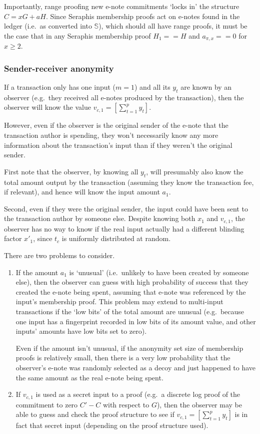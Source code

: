 Importantly, range proofing new e-note commitments `locks in' the structure $C = x G + a H$. Since Seraphis membership proofs act on e-notes found in the ledger (i.e.\ as converted into $\mathbb{S}$), which should all have range proofs, it must be the case that in any Seraphis membership proof $H_1 == H$ and $a_{\pi,x} == 0$ for $x \geq 2$.

\subsubsection{Sender-receiver anonymity}
\label{subsubsec:confidential-transactions-sender-receiver-anonymity}

If a transaction only has one input ($m = 1$) and all its $y_t$ are known by an observer (e.g.\ they received all e-notes produced by the transaction), then the observer will know the value $v_{c,1} = [\sum^{p}_{t=1} y_t]$.

However, even if the observer is the original sender of the e-note that the transaction author is spending, they won't necessarily know any more information about the transaction's input than if they weren't the original sender.

First note that the observer, by knowing all $y_t$, will presumably also know the total amount output by the transaction (assuming they know the transaction fee, if relevant), and hence will know the input amount $a_1$.

Second, even if they were the original sender, the input could have been sent to the transaction author by someone else. Despite knowing both $x_1$ and $v_{c,1}$, the observer has no way to know if the real input actually had a different blinding factor $x'_1$, since $t_c$ is uniformly distributed at random.

There are two problems to consider.
\begin{enumerate}
    \item If the amount $a_1$ is `unusual' (i.e.\ unlikely to have been created by someone else), then the observer can guess with high probability of success that they created the e-note being spent, assuming that e-note was referenced by the input's membership proof. This problem may extend to multi-input transactions if the `low bits' of the total amount are unusual (e.g.\ because one input has a fingerprint recorded in low bits of its amount value, and other inputs' amounts have low bits set to zero).

    Even if the amount isn't unusual, if the anonymity set size of membership proofs is relatively small, then there is a very low probability that the observer's e-note was randomly selected as a decoy and just happened to have the same amount as the real e-note being spent.

    \item If $v_{c,1}$ is used as a secret input to a proof (e.g.\ a discrete log proof of the commitment to zero $C' - C$ with respect to $G$), then the observer may be able to guess and check the proof structure to see if $v_{c,1} = [\sum^{p}_{t=1} y_t]$ is in fact that secret input (depending on the proof structure used).
\end{enumerate}


